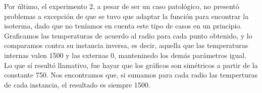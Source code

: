 Por último, el experimento 2, a pesar de ser un caso patológico, no presentó problemas a excepción de que se tuvo que adaptar la función para encontrar la isoterma, dado que no teníamos en cuenta este tipo de casos en un principio. Graficamos las temperaturas de acuerdo al radio para cada punto obtenido, y lo comparamos contra su instancia inversa, es decir, aquella que las temperaturas internas valen 1500 y las externas 0, manteninedo los demás parámetros igual. \\
Lo que sí resultó llamativo, fue hayar que los gráficos son simétricos a partir de la constante 750. Nos encontramos que, si sumamos para cada radio las temperturas de cada instancia, el resultado es siempre 1500. 

